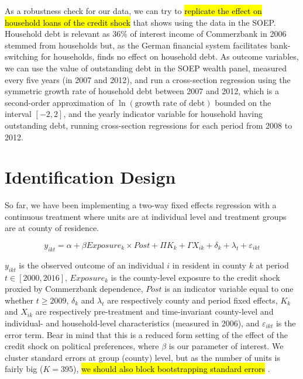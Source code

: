 \documentclass[11pt]{article}
\begin{document}
As a robustness check for our data, we can try to \hl{replicate the effect on household loans of the credit shock} that \citet{bib:huber2018} shows using the data in the SOEP. Household debt is relevant as 36\% of interest income of Commerzbank in 2006 stemmed from households but, as the German financial system facilitates bank-switching for households, \citet{bib:huber2018} finds no effect on household debt. As outcome variables, we can use the value of outstanding debt in the SOEP wealth panel, measured every five years (in 2007 and 2012), and run a cross-section regression using the symmetric growth rate of household debt between 2007 and 2012, which is a second-order approximation of $\ln(\text{growth rate of debt})$ bounded on the interval $[-2, 2]$, and the yearly indicator variable for household having outstanding debt, running cross-section regressions for each period from 2008 to 2012.\\



\section{Identification Design}\label{sec:identification}

So far, we have been implementing a two-way fixed effects regression with a continuous treatment where units are at individual level and treatment groups are at county of residence. 

\begin{equation}
    y_{ikt} = \alpha + \beta Exposure_{k} \times Post + \Pi K_{k} + \Gamma X_{ik} + \delta_{k} + \lambda_{t} + \varepsilon_{ikt}\label{eq:twfecurrent}
\end{equation}

$y_{ikt}$ is the observed outcome of an individual $i$ in resident in county $k$ at period $t \in [2000, 2016]$, $Exposure_{k}$ is the county-level exposure to the credit shock proxied by Commerzbank dependence, $Post$ is an indicator variable equal to one whether $t \geq 2009$, $\delta_{k}$ and $\lambda_{t}$ are respectively county and period fixed effects, $K_k$ and $X_{ik}$ are respectively pre-treatment and time-invariant county-level and individual- and household-level characteristics (measured in 2006), and $\varepsilon_{ikt}$ is the error term. Bear in mind that this is a reduced form setting  of the effect of the credit shock on political preferences, where $\beta$ is our parameter of interest. We cluster standard errors at group (county) level, but as the number of units is fairly big ($K = 395$), \hl{we should also block bootstrapping standard errors} \citep{bib:bertrand2004}.
\end{document}
